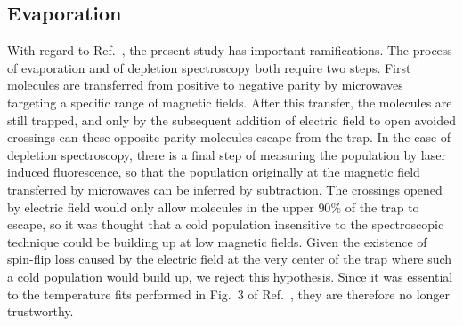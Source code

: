 \documentclass[%
 reprint,
 amsmath,amssymb,
 aps,
pra,
]{revtex4-1}
\begin{document}
\subsection{Evaporation\label{sec:evap}}

With regard to Ref.~\cite{Stuhl2012evap}, the present study has important ramifications. 
The process of evaporation and of depletion spectroscopy both require two steps.
First molecules are transferred from positive to negative parity by microwaves targeting a specific range of magnetic fields.
After this transfer, the molecules are still trapped, and only by the subsequent addition of electric field to open avoided crossings can these opposite parity molecules escape from the trap.
In the case of depletion spectroscopy, there is a final step of measuring the population by laser induced fluorescence, so that the population originally at the magnetic field transferred by microwaves can be inferred by subtraction.
The crossings opened by electric field would only allow molecules in the upper $90\%$ of the trap to escape, so it was thought that a cold population insensitive to the spectroscopic technique could be building up at low magnetic fields.
Given the existence of spin-flip loss caused by the electric field at the very center of the trap where such a cold population would build up, we reject this hypothesis.
Since it was essential to the temperature fits performed in Fig.~3 of Ref.~\cite{Stuhl2012evap}, they are therefore no longer trustworthy.
\end{document}
